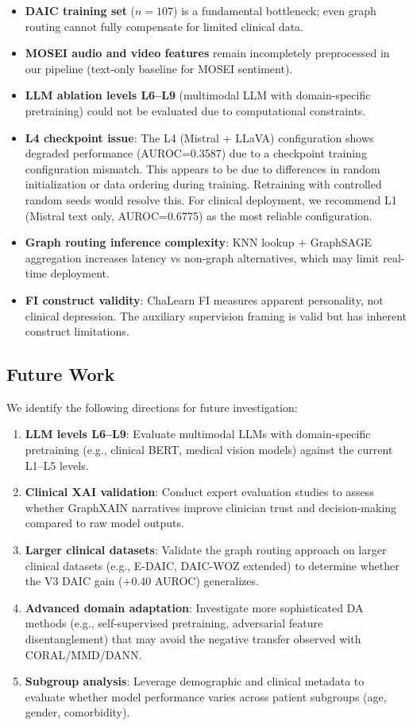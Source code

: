 \documentclass[12pt,oneside]{book}
\begin{document}
\begin{itemize}
\begin{itemize}
    \item \textbf{DAIC training set} ($n=107$) is a fundamental bottleneck; even graph routing cannot fully compensate for limited clinical data.
    \item \textbf{MOSEI audio and video features} remain incompletely preprocessed in our pipeline (text-only baseline for MOSEI sentiment).
    \item \textbf{LLM ablation levels L6--L9} (multimodal LLM with domain-specific pretraining) could not be evaluated due to computational constraints.
    \item \textbf{L4 checkpoint issue}: The L4 (Mistral + LLaVA) configuration shows degraded performance (AUROC=0.3587) due to a checkpoint training configuration mismatch. This appears to be due to differences in random initialization or data ordering during training. Retraining with controlled random seeds would resolve this. For clinical deployment, we recommend L1 (Mistral text only, AUROC=0.6775) as the most reliable configuration.
    \item \textbf{Graph routing inference complexity}: KNN lookup + GraphSAGE aggregation increases latency vs non-graph alternatives, which may limit real-time deployment.
    \item \textbf{FI construct validity}: ChaLearn FI measures apparent personality, not clinical depression. The auxiliary supervision framing is valid but has inherent construct limitations.
\end{itemize}

\subsection{Future Work}

We identify the following directions for future investigation:
\begin{enumerate}
    \item \textbf{LLM levels L6--L9}: Evaluate multimodal LLMs with domain-specific pretraining (e.g., clinical BERT, medical vision models) against the current L1--L5 levels.
    \item \textbf{Clinical XAI validation}: Conduct expert evaluation studies to assess whether GraphXAIN narratives improve clinician trust and decision-making compared to raw model outputs.
    \item \textbf{Larger clinical datasets}: Validate the graph routing approach on larger clinical datasets (e.g., E-DAIC, DAIC-WOZ extended) to determine whether the V3 DAIC gain ($+0.40$ AUROC) generalizes.
    \item \textbf{Advanced domain adaptation}: Investigate more sophisticated DA methods (e.g., self-supervised pretraining, adversarial feature disentanglement) that may avoid the negative transfer observed with CORAL/MMD/DANN.
    \item \textbf{Subgroup analysis}: Leverage demographic and clinical metadata to evaluate whether model performance varies across patient subgroups (age, gender, comorbidity).
\end{enumerate}


\end{itemize}
\end{document}
